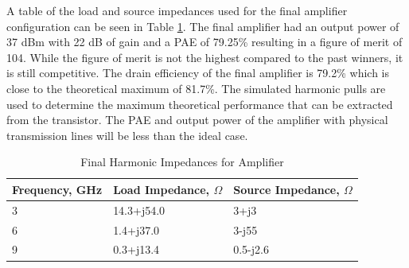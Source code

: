 A table of the load and source impedances used for the final amplifier configuration can be seen in Table \ref{table:harmonic_impedance}. The final amplifier had an output power of 37 dBm with 22 dB of gain and a PAE of 79.25\% resulting in a figure of merit of 104. While the figure of merit is not the highest compared to the past winners, it is still competitive. The drain efficiency of the final amplifier is 79.2\% which is close to the theoretical maximum of 81.7\%. The simulated harmonic pulls are used to determine the maximum theoretical performance that can be extracted from the transistor. The PAE and output power of the amplifier with physical transmission lines will be less than the ideal case.

\begin{table}
    \centering
    \caption{Final Harmonic Impedances for Amplifier}
    \label{table:harmonic_impedance}
    \begin{tabular}{|l|l|l|} \hline
    {Frequency, GHz} & {Load Impedance, $\Omega$} & {Source Impedance, $\Omega$} \\ \hline
    {3} & {14.3+j54.0} & {3+j3} \\ \hline
    {6} & {1.4+j37.0} & {3-j55} \\ \hline
    {9} & {0.3+j13.4} & {0.5-j2.6} \\ \hline
    \end{tabular}
\end{table}

